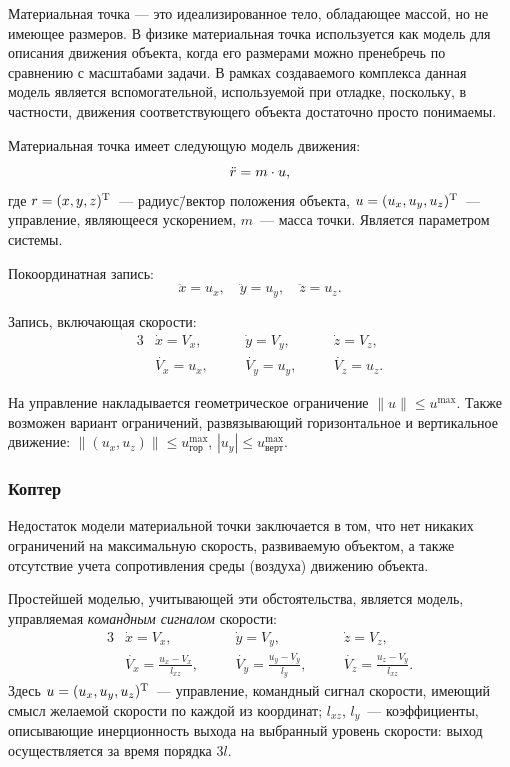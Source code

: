 \documentclass[a4paper,12pt]{article}
\begin{document}
Материальная точка --- это идеализированное тело, обладающее массой, но не имеющее размеров. В физике материальная точка используется как модель для описания движения объекта, когда его размерами можно пренебречь по сравнению с масштабами задачи. В рамках создаваемого комплекса данная модель является вспомогательной, используемой при отладке, поскольку, в частности, движения соответствующего объекта достаточно просто понимаемы.

Материальная точка имеет следующую модель движения:
\begin{equation}
    \Ddot{r} = m \cdot u,
\end{equation}
где $r = (x, y, z)^\text{\textup{T}}$~--- радиус\=/вектор положения объекта, $u = (u_x, u_y, u_z)^\text{\textup{T}}$~--- управление, являющееся ускорением, $m$~--- масса точки. Является параметром системы.

Покоординатная запись:
\begin{equation*}
  \ddot{x} = u_x, \quad \ddot{y} = u_y, \quad \ddot{z} = u_z.
\end{equation*}

Запись, включающая скорости:
\begin{alignat*}{3}
  & \dot{x} = V_x,  & \quad & \dot{y} = V_y, & \quad & \dot{z} = V_z, \\
  & \dot{V_x} = u_x, & & \dot{V_y} = u_y, & & \dot{V_z} = u_z.
\end{alignat*}

На управление накладывается геометрическое ограничение $\|u\| \leqslant u^{\max}$. Также возможен вариант ограничений, развязывающий горизонтальное и вертикальное движение: $\big\|(u_x,u_z)\big\| \leqslant u^{\max}_\text{гор}$, $|u_y| \leqslant u^{\max}_\text{верт}$.


\subsubsection{Коптер}  

Недостаток модели материальной точки заключается в том, что нет никаких ограничений на максимальную скорость, развиваемую объектом, а также отсутствие учета сопротивления среды (воздуха) движению объекта.

Простейшей моделью, учитывающей эти обстоятельства, является модель, управляемая \textit{командным сигналом} скорости:
\begin{alignat*}{3}
  & \dot{x} = V_x, & \quad & \dot{y} = V_y, & \quad
    & \dot{z} = V_z, \\
  & \displaystyle
    \dot{V_x} = \frac{u_x - V_x}{l_{xz}},  & &
    \dot{V_y} = \frac{u_y - V_y}{l_{y}},   & &
    \dot{V_z} = \frac{u_z - V_y}{l_{xz}}.
\end{alignat*}
Здесь $u = (u_x, u_y, u_z)^\text{\textup{T}}$~--- управление, командный сигнал скорости, имеющий смысл желаемой скорости по каждой из координат; $l_{xz}$, $l_y$~--- коэффициенты, описывающие инерционность выхода на выбранный уровень скорости: выход осуществляется за время порядка $3l$. 
\end{document}
